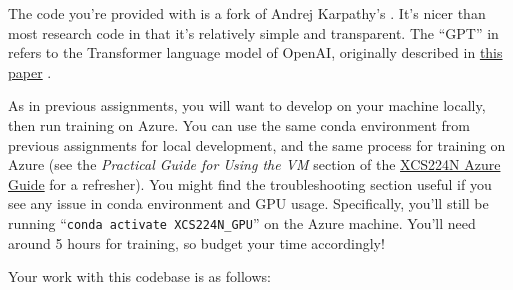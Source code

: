 
The code you're provided with is a fork of Andrej Karpathy's \href{https://github.com/karpathy/minGPT}{\mingpt}.
It's nicer than most research code in that it's relatively simple and transparent.
The ``GPT'' in \mingpt refers to the Transformer language model of OpenAI, originally described in \href{https://s3-us-west-2.amazonaws.com/openai-assets/research-covers/language-unsupervised/language_understanding_paper.pdf}{this paper} \cite{radford2018improving}.


As in previous assignments, you will want to develop on your machine locally, then run training on Azure. You can use the same conda environment from previous assignments for local development, and the same process for training on Azure (see the \textit{Practical Guide for Using the VM} section of the \href{https://docs.google.com/document/d/10J520Vnb1LnAMo0qgSYpG5cEEbomqQ371NIqg1IAv-4/edit?usp=sharing}{XCS224N Azure Guide} for a refresher). You might find the troubleshooting section useful if you see any issue in conda environment and GPU usage. Specifically, you'll still be running ``\texttt{conda activate XCS224N\_GPU}'' on the Azure machine. You'll need around 5 hours for training, so budget your time accordingly!

Your work with this codebase is as follows:

